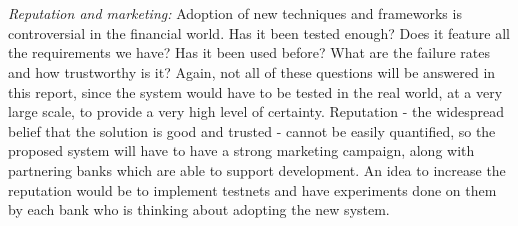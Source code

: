 \documentclass[12pt,twoside]{article}
\begin{document}
\\ \\
\textit{Reputation and marketing:} Adoption of new techniques and frameworks is controversial in the financial world. Has it been tested enough? Does it feature all the requirements we have? Has it been used before? What are the failure rates and how trustworthy is it? Again, not all of these questions will be answered in this report, since the system would have to be tested in the real world, at a very large scale, to provide a very high level of certainty. Reputation - the widespread belief that the solution is good and trusted - cannot be easily quantified, so the proposed system will have to have a strong marketing campaign, along with partnering banks which are able to support development. An idea to increase the reputation would be to implement testnets and have experiments done on them by each bank who is thinking about adopting the new system.
\end{document}
